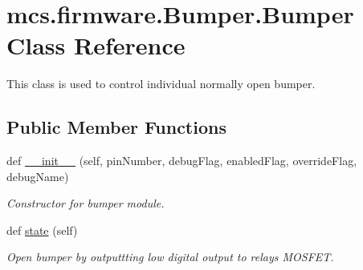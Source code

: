 \hypertarget{classmcs_1_1firmware_1_1Bumper_1_1Bumper}{}\section{mcs.\+firmware.\+Bumper.\+Bumper Class Reference}
\label{classmcs_1_1firmware_1_1Bumper_1_1Bumper}


This class is used to control individual normally open bumper.  


\subsection*{Public Member Functions}
\begin{DoxyCompactItemize}
\item 
def \hyperlink{classmcs_1_1firmware_1_1Bumper_1_1Bumper_abebf91c9798c3a027cb8665bb6ab22b6}{\+\_\+\+\_\+init\+\_\+\+\_\+} (self, pin\+Number, debug\+Flag, enabled\+Flag, override\+Flag, debug\+Name)
\begin{DoxyCompactList}\small\item\em Constructor for bumper module. \end{DoxyCompactList}\item 
\mbox{\label{classmcs_1_1firmware_1_1Bumper_1_1Bumper_a420be98ee9a600ccd0a934bebbe86009}} 
def \hyperlink{classmcs_1_1firmware_1_1Bumper_1_1Bumper_a420be98ee9a600ccd0a934bebbe86009}{state} (self)
\begin{DoxyCompactList}\small\item\em Open bumper by outputtting low digital output to relay\textquotesingle{}s M\+O\+S\+F\+ET. \end{DoxyCompactList}\end{DoxyCompactItemize}
